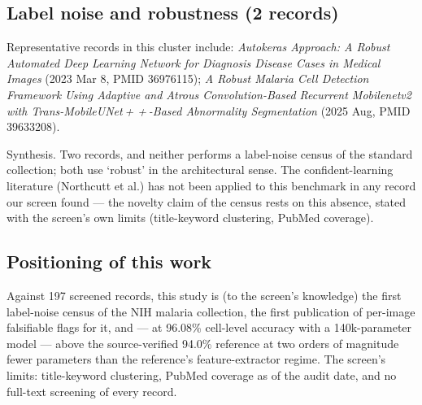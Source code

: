 \subsection*{Label noise and robustness (2 records)}
Representative records in this cluster include: \emph{Autokeras Approach: A Robust Automated Deep Learning Network for Diagnosis Disease Cases in Medical Images} (2023 Mar 8, PMID 36976115); \emph{A Robust Malaria Cell Detection Framework Using Adaptive and Atrous Convolution-Based Recurrent Mobilenetv2 with Trans-MobileUNet + + -Based Abnormality Segmentation} (2025 Aug, PMID 39633208).\par

Synthesis. Two records, and neither performs a label-noise census of the standard collection; both use `robust' in the architectural sense. The confident-learning literature (Northcutt et al.) has not been applied to this benchmark in any record our screen found --- the novelty claim of the census rests on this absence, stated with the screen's own limits (title-keyword clustering, PubMed coverage).


\subsection*{Positioning of this work}
Against 197 screened records, this study is (to the screen's knowledge) the first label-noise census of the NIH malaria collection, the first publication of per-image falsifiable flags for it, and --- at 96.08\% cell-level accuracy with a 140k-parameter model --- above the source-verified 94.0\% reference at two orders of magnitude fewer parameters than the reference's feature-extractor regime. The screen's limits: title-keyword clustering, PubMed coverage as of the audit date, and no full-text screening of every record.

